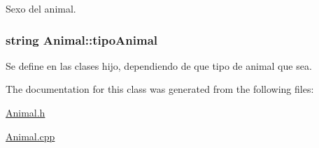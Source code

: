 Sexo del animal. 

\subsubsection[{\texorpdfstring{tipo\+Animal}{tipoAnimal}}]{\setlength{\rightskip}{0pt plus 5cm}string Animal\+::tipo\+Animal}\hypertarget{classAnimal_ae7a4f121949d20c359414a3002e7eff7}{}\label{classAnimal_ae7a4f121949d20c359414a3002e7eff7}


Se define en las clases hijo, dependiendo de que tipo de animal que sea. 



The documentation for this class was generated from the following files\+:\begin{DoxyCompactItemize}
\item 
\hyperlink{Animal_8h}{Animal.\+h}\item 
\hyperlink{Animal_8cpp}{Animal.\+cpp}\end{DoxyCompactItemize}
